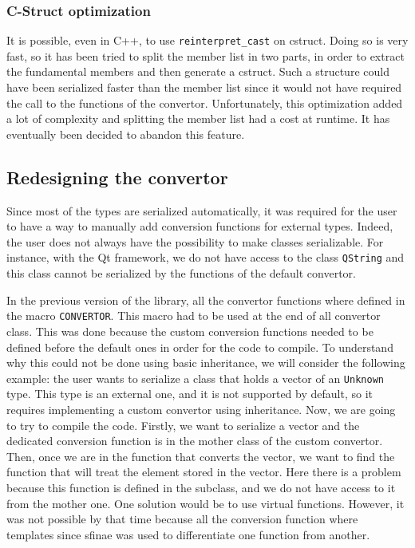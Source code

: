 \subsubsection{C-Struct optimization}

It is possible, even in C++, to use \texttt{reinterpret\_cast} on
\gls{cstruct}. Doing so is very fast, so it has been tried to split the member
list in two parts, in order to extract the fundamental members and then generate
a \gls{cstruct}. Such a structure could have been serialized faster than the
member list since it would not have required the call to the functions of the
convertor. Unfortunately, this optimization added a lot of complexity and
splitting the member list had a cost at runtime. It has eventually been decided
to abandon this feature.

\subsection{Redesigning the convertor}
\label{sec:convertor}

Since most of the types are serialized automatically, it was required for the
user to have a way to manually add conversion functions for external types.
Indeed, the user does not always have the possibility to make classes
serializable. For instance, with the Qt framework, we do not have access to the
class \texttt{QString} and this class cannot be serialized by the functions of
the default convertor.

In the previous version of the library, all the convertor functions where
defined in the macro \texttt{CONVERTOR}. This macro had to be used at the end of
all convertor class. This was done because the custom conversion functions
needed to be defined before the default ones in order for the code to compile.
To understand why this could not be done using basic inheritance, we will
consider the following example: the user wants to serialize a class that holds a
vector of an \texttt{Unknown} type. This type is an external one, and it is not
supported by default, so it requires implementing a custom convertor using
inheritance. Now, we are going to try to compile the code. Firstly, we want to
serialize a vector and the dedicated conversion function is in the mother class
of the custom convertor. Then, once we are in the function that converts the
vector, we want to find the function that will treat the element stored in the
vector. Here there is a problem because this function is defined in the
subclass, and we do not have access to it from the mother one. One solution
would be to use virtual functions. However, it was not possible by that time
because all the conversion function where templates since \gls{sfinae} was used
to differentiate one function from another.

